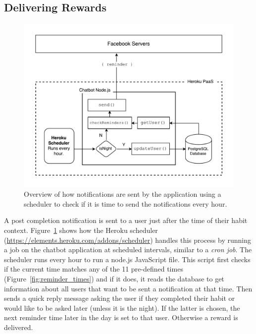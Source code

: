\subsection{Delivering Rewards}

\begin{figure}[H]
    \centering
    \includegraphics[width=6in]{../resources/diagrams/diagram-delivering-rewards.pdf}
    \caption{Overview of how notifications are sent by the application using a scheduler to check if it is time to send the notifications every hour.}
    \label{fig:prototype_sending_notifications}
\end{figure}

A post completion notification is sent to a user just after the time of their habit context. Figure~\ref{fig:prototype_sending_notifications} shows how the Heroku scheduler (\url{https://elements.heroku.com/addons/scheduler}) handles this process by running a job on the chatbot application at scheduled intervals, similar to a \textit{cron job}. The scheduler runs every hour to run a node.js JavaScript file. This script first checks if the current time matches any of the 11 pre-defined times (Figure~\ref{fig:reminder_times}) and if it does, it reads the database to get information about all users that want to be sent a notification at that time. Then sends a quick reply message asking the user if they completed their habit or would like to be asked later (unless it is the night). If the latter is chosen, the next reminder time later in the day is set to that user. Otherwise a reward is delivered.

